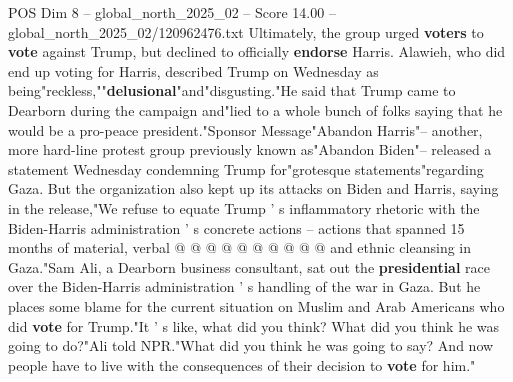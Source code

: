 \begin{textsample}{POS Dim 8 – global\_north\_2025\_02 – Score 14.00 – global\_north\_2025\_02/120962476.txt}
Ultimately, the group urged \textbf{voters} to \textbf{vote} against Trump, but declined to officially \textbf{endorse} Harris.
Alawieh, who did end up voting for Harris, described Trump on Wednesday as being"reckless,""\textbf{delusional}"and"disgusting."He said that Trump came to Dearborn during the campaign and"lied to a whole bunch of folks saying that he would be a pro-peace president."Sponsor Message"Abandon Harris"-- another, more hard-line protest group previously known as"Abandon Biden"-- released a statement Wednesday condemning Trump for"grotesque statements"regarding Gaza.
But the organization also kept up its attacks on Biden and Harris, saying in the release,"We refuse to equate Trump ' s inflammatory rhetoric with the Biden-Harris administration ' s concrete actions -- actions that spanned 15 months of material, verbal @ @ @ @ @ @ @ @ @ @ and ethnic cleansing in Gaza."Sam Ali, a Dearborn business consultant, sat out the \textbf{presidential} race over the Biden-Harris administration ' s handling of the war in Gaza.
But he places some blame for the current situation on Muslim and Arab Americans who did \textbf{vote} for Trump."It ' s like, what did you think?
What did you think he was going to do?"Ali told NPR."What did you think he was going to say?
And now people have to live with the consequences of their decision to \textbf{vote} for him."

\end{textsample}
